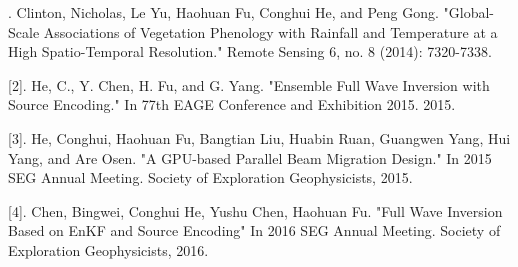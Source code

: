 \documentclass[11pt, a4paper]{awesome-cv}
\begin{document}


\begin{cvparagraph}
[1]. Clinton, Nicholas, Le Yu, Haohuan Fu, Conghui He, and Peng Gong. "Global-Scale Associations of Vegetation Phenology with Rainfall and Temperature at a High Spatio-Temporal Resolution." Remote Sensing 6, no. 8 (2014): 7320-7338.

[2]. He, C., Y. Chen, H. Fu, and G. Yang. "Ensemble Full Wave Inversion with Source Encoding." In 77th EAGE Conference and Exhibition 2015. 2015.

[3]. He, Conghui, Haohuan Fu, Bangtian Liu, Huabin Ruan, Guangwen Yang, Hui Yang, and Are Osen. "A GPU-based Parallel Beam Migration Design." In 2015 SEG Annual Meeting. Society of Exploration Geophysicists, 2015.

[4]. Chen, Bingwei, Conghui He, Yushu Chen, Haohuan Fu. "Full Wave Inversion Based on EnKF and Source Encoding" In 2016 SEG Annual Meeting. Society of Exploration Geophysicists, 2016.
\end{cvparagraph}


\end{document}
